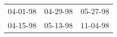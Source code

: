 \begin{supertabular}{lll}
 04-01-98\textsuperscript{} &  04-29-98\textsuperscript{} &  05-27-98\textsuperscript{} \\
 04-15-98\textsuperscript{} &  05-13-98\textsuperscript{} &  11-04-98\textsuperscript{} \\
\end{supertabular}
